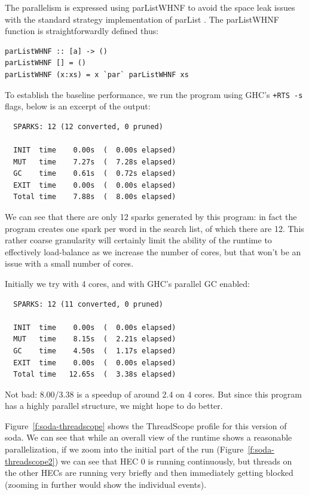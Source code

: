 \documentclass[twocolumn,9pt]{sigplanconf}
\newcommand{\codef}[1]{{\fontfamily{cmss}\small#1}}
\let\cite=\citep
\begin{document}
The parallelism is expressed using \codef{parListWHNF} to avoid the
space leak issues with the standard strategy implementation of
\codef{parList} \cite{multicore-ghc}.  The \codef{parListWHNF}
function is straightforwardly defined thus:

\begin{verbatim}
parListWHNF :: [a] -> ()
parListWHNF [] = ()
parListWHNF (x:xs) = x `par` parListWHNF xs
\end{verbatim}

To establish the baseline performance, we run the program using GHC's
\texttt{+RTS -s} flags, below is an excerpt of the output:

\begin{verbatim}
  SPARKS: 12 (12 converted, 0 pruned)

  INIT  time    0.00s  (  0.00s elapsed)
  MUT   time    7.27s  (  7.28s elapsed)
  GC    time    0.61s  (  0.72s elapsed)
  EXIT  time    0.00s  (  0.00s elapsed)
  Total time    7.88s  (  8.00s elapsed)
\end{verbatim}

We can see that there are only 12 sparks generated by this program: in
fact the program creates one spark per word in the search list, of
which there are 12.  This rather coarse granularity will certainly
limit the ability of the runtime to effectively load-balance as we
increase the number of cores, but that won't be an issue with a small
number of cores.

Initially we try with 4 cores, and with GHC's parallel GC enabled:

\begin{verbatim}
  SPARKS: 12 (11 converted, 0 pruned)

  INIT  time    0.00s  (  0.00s elapsed)
  MUT   time    8.15s  (  2.21s elapsed)
  GC    time    4.50s  (  1.17s elapsed)
  EXIT  time    0.00s  (  0.00s elapsed)
  Total time   12.65s  (  3.38s elapsed)
\end{verbatim}

Not bad: 8.00/3.38 is a speedup of around 2.4 on 4 cores.  But since
this program has a highly parallel structure, we might hope to do
better.  

Figure~\ref{f:soda-threadscope} shows the ThreadScope profile for this
version of soda.  We can see that while an overall view of the runtime
shows a reasonable parallelization, if we zoom into the initial part
of the run (Figure~\ref{f:soda-threadscope2}) we can see that HEC 0 is
running continuously, but threads on the other HECs are running very
briefly and then immediately getting blocked (zooming in further would
show the individual events).
\end{document}
